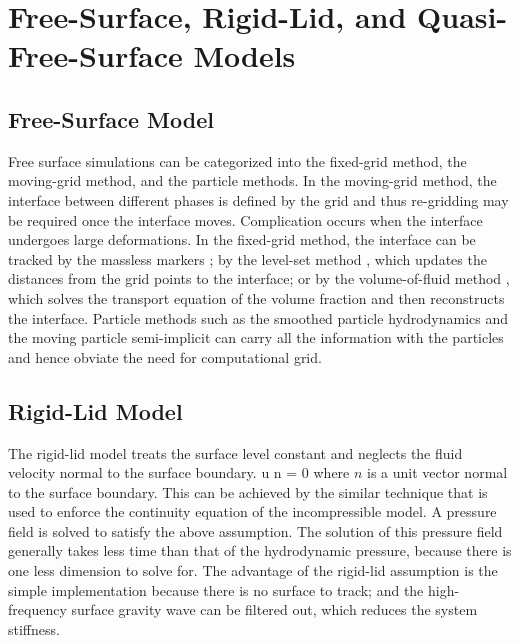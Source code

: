 \normalsize
\section{Free-Surface, Rigid-Lid, and Quasi-Free-Surface Models}
\subsection*{Free-Surface Model}
Free surface simulations \cite{Scardovelli1999} can be categorized into the fixed-grid method, the moving-grid method, and the particle methods.
In the moving-grid method, the interface between different phases is defined by the grid and thus re-gridding may be required once the interface moves. Complication occurs when the interface undergoes large deformations.
In the fixed-grid method, the interface can be tracked by the massless markers \cite{Harlow1965}; by the level-set method \cite{Sussman1994}, which updates the distances from the grid points to the interface; or by the volume-of-fluid method \cite{Noh1976, HIRT1981, Li1995, Rider1998}, which solves the transport equation of the volume fraction and then reconstructs the interface.
Particle methods such as the smoothed particle hydrodynamics \cite{Monaghan1994} and the moving particle semi-implicit \cite{Koshizuka1998} can carry all the information with the particles and hence obviate the need for computational grid.

\subsection*{Rigid-Lid Model}
The rigid-lid model \cite{Marshall1997} treats the surface level constant and neglects the fluid velocity normal to the surface boundary.
\be
\+u \cdot n = 0
\ee
where $n$ is a unit vector normal to the surface boundary. This can be achieved by the similar technique that is used to enforce the continuity equation of the incompressible model. A pressure field is solved to satisfy the above assumption. The solution of this pressure field generally takes less time than that of the hydrodynamic pressure, because there is one less dimension to solve for. The advantage of the rigid-lid assumption is the simple implementation because there is no surface to track; and the high-frequency surface gravity wave can be filtered out, which reduces the system stiffness.


